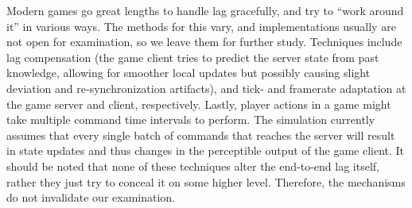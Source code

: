 Modern games go great lengths to handle lag gracefully, and try to ``work around it'' in various ways. The methods for this vary, and implementations usually are not open for examination, so we leave them for further study. Techniques include lag compensation (the game client tries to predict the server state from past knowledge, allowing for smoother local updates but possibly causing slight deviation and re-synchronization artifacts), and tick- and framerate adaptation at the game server and client, respectively. Lastly, player actions in a game might take multiple command time intervals to perform. The simulation currently assumes that every single batch of commands that reaches the server will result in state updates and thus changes in the perceptible output of the game client. It should be noted that none of these techniques alter the end-to-end lag itself, rather they just try to conceal it on some higher level. Therefore, the mechanisms do not invalidate our examination.



